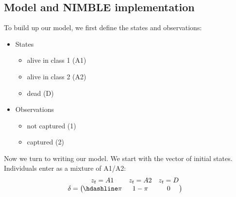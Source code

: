 \documentclass[
  12pt,
]{krantz}
\providecommand{\tightlist}{%
  \setlength{\itemsep}{0pt}\setlength{\parskip}{0pt}}
\begin{document}
\subsection{Model and NIMBLE implementation}\label{model-and-nimble-implementation-5}

To build up our model, we first define the states and observations:

\begin{itemize}
\tightlist
\item
  States

  \begin{itemize}
  \tightlist
  \item
    alive in class 1 (A1)
  \item
    alive in class 2 (A2)
  \item
    dead (D)
  \end{itemize}
\item
  Observations

  \begin{itemize}
  \tightlist
  \item
    not captured (1)
  \item
    captured (2)
  \end{itemize}
\end{itemize}

Now we turn to writing our model. We start with the vector of initial states. Individuals enter as a mixture of A1/A2:
\[\begin{matrix}
& \\
\mathbf{\delta} =
  \left ( \vphantom{ \begin{matrix} 12 \end{matrix} } \right .
          \end{matrix}
          \hspace{-1.2em}
          \begin{matrix}
          z_t=A1 & z_t=A2 & z_t=D \\ \hdashline
          \pi & 1 - \pi & 0\\
          \end{matrix}
          \hspace{-0.2em}
          \begin{matrix}
          & \\
          \left . \vphantom{ \begin{matrix} 12 \end{matrix} } \right )
\begin{matrix}
\end{matrix}
\end{matrix}\]
\end{document}
